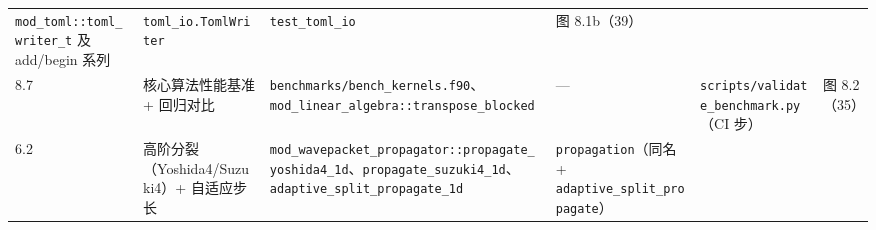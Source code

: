 \documentclass[
]{ctexbook}
\begin{document}
\begin{longtable}[]{@{}llllll@{}}
\begin{minipage}[t]{0.14\columnwidth}
\texttt{mod\_toml::toml\_writer\_t} 及 add/begin 系列\strut
\end{minipage} & \begin{minipage}[t]{0.14\columnwidth}\raggedright
\texttt{toml\_io.TomlWriter}\strut
\end{minipage} & \begin{minipage}[t]{0.14\columnwidth}\raggedright
\texttt{test\_toml\_io}\strut
\end{minipage} & \begin{minipage}[t]{0.14\columnwidth}\raggedright
图 8.1b（39）\strut
\end{minipage}\tabularnewline
\begin{minipage}[t]{0.14\columnwidth}\raggedright
8.7\strut
\end{minipage} & \begin{minipage}[t]{0.14\columnwidth}\raggedright
核心算法性能基准 + 回归对比\strut
\end{minipage} & \begin{minipage}[t]{0.14\columnwidth}\raggedright
\texttt{benchmarks/bench\_kernels.f90}、\texttt{mod\_linear\_algebra::transpose\_blocked}\strut
\end{minipage} & \begin{minipage}[t]{0.14\columnwidth}\raggedright
---\strut
\end{minipage} & \begin{minipage}[t]{0.14\columnwidth}\raggedright
\texttt{scripts/validate\_benchmark.py}（CI 步）\strut
\end{minipage} & \begin{minipage}[t]{0.14\columnwidth}\raggedright
图 8.2（35）\strut
\end{minipage}\tabularnewline
\begin{minipage}[t]{0.14\columnwidth}\raggedright
6.2\strut
\end{minipage} & \begin{minipage}[t]{0.14\columnwidth}\raggedright
高阶分裂（Yoshida4/Suzuki4）+ 自适应步长\strut
\end{minipage} & \begin{minipage}[t]{0.14\columnwidth}\raggedright
\texttt{mod\_wavepacket\_propagator::propagate\_yoshida4\_1d}、\texttt{propagate\_suzuki4\_1d}、\texttt{adaptive\_split\_propagate\_1d}\strut
\end{minipage} & \begin{minipage}[t]{0.14\columnwidth}\raggedright
\texttt{propagation}（同名 + \texttt{adaptive\_split\_propagate}）\strut
\end{minipage} & \begin{minipage}[t]{0.14\columnwidth}\raggedright

\end{minipage}
\end{longtable}
\end{document}
